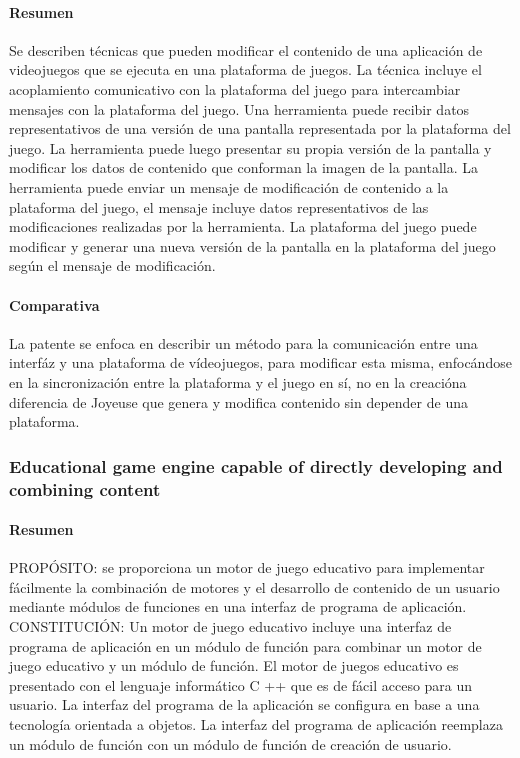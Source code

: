 \documentclass[]{article}
\begin{document}
\paragraph{Resumen} 
Se describen t\'ecnicas que pueden modificar el contenido de una aplicaci\'on de videojuegos que se ejecuta en una plataforma de juegos. La t\'ecnica incluye el acoplamiento comunicativo con la plataforma del juego para intercambiar mensajes con la plataforma del juego. Una herramienta puede recibir datos representativos de una versi\'on de una pantalla representada por la plataforma del juego. La herramienta puede luego presentar su propia versi\'on de la pantalla y modificar los datos de contenido que conforman la imagen de la pantalla. La herramienta puede enviar un mensaje de modificaci\'on de contenido a la plataforma del juego, el mensaje incluye datos representativos de las modificaciones realizadas por la herramienta. La plataforma del juego puede modificar y generar una nueva versi\'on de la pantalla en la plataforma del juego seg\'un el mensaje de modificaci\'on.
\cite{EA}
\paragraph{Comparativa}
La patente se enfoca en describir un m\'etodo para la comunicaci\'on entre una interf\'az y una plataforma de v\'ideojuegos, para modificar esta misma, enfoc\'andose en la sincronizaci\'on entre la plataforma y el juego en s\'i, no en la creaci\'ona diferencia de Joyeuse que genera y modifica contenido sin depender de una plataforma. 
\subsubsection{Educational game engine capable of directly developing and combining content}
\paragraph{Resumen} 
PROP\'OSITO: se proporciona un motor de juego educativo para implementar f\'acilmente la combinaci\'on de motores y el desarrollo de contenido de un usuario mediante m\'odulos de funciones en una interfaz de programa de aplicaci\'on. 
\newline
\newline
CONSTITUCI\'ON: Un motor de juego educativo incluye una interfaz de programa de aplicaci\'on en un m\'odulo de funci\'on para combinar un motor de juego educativo y un m\'odulo de funci\'on. El motor de juegos educativo es presentado con el lenguaje inform\'atico C ++ que es de f\'acil acceso para un usuario. La interfaz del programa de la aplicaci\'on se configura en base a una tecnolog\'ia orientada a objetos. La interfaz del programa de aplicaci\'on reemplaza un m\'odulo de funci\'on con un m\'odulo de funci\'on de creaci\'on de usuario.
\cite{Edu}
\end{document}
